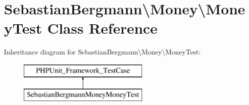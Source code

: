 \hypertarget{classSebastianBergmann_1_1Money_1_1MoneyTest}{}\section{Sebastian\+Bergmann\textbackslash{}Money\textbackslash{}Money\+Test Class Reference}
\label{classSebastianBergmann_1_1Money_1_1MoneyTest}
Inheritance diagram for Sebastian\+Bergmann\textbackslash{}Money\textbackslash{}Money\+Test\+:\begin{figure}[H]
\begin{center}
\leavevmode
\includegraphics[height=2.000000cm]{classSebastianBergmann_1_1Money_1_1MoneyTest}
\end{center}
\end{figure}
